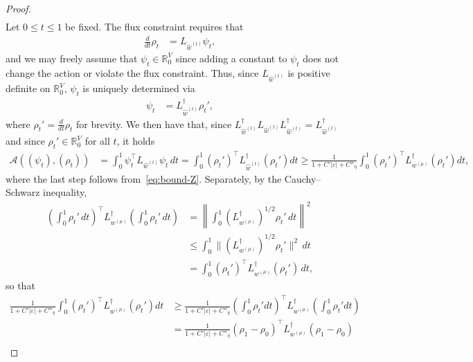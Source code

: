 \documentclass[11pt,a4paper]{article}
\begin{document}
\begin{proof}
\begin{align}
        \end{align}
    Let $0\le t\le 1$ be fixed. The flux constraint requires that
        \begin{align*}
            \frac{d}{dt}\rho_t &= L_{\widehat{w}^{(t)}} \psi_t,
        \end{align*}
    and we may freely assume that $\psi_t\in\mathbb{R}^{V}_0$ since adding a constant to $\psi_t$ does not change the action or violate the flux constraint. Thus, since $L_{\widehat{w}^{(t)}}$ is positive definite on $\mathbb{R}^{V}_0$, $\psi_t$ is uniquely determined via
        \begin{align}\label{eq:psi-t-uniquely-determined}
            \psi_t &= L_{\widehat{w}^{(t)}}^{\dagger} \rho_{t}',
        \end{align}
    where $\rho_{t}' = \frac{d}{dt} \rho_t$ for brevity. We then have that, since $ L_{\widehat{w}^{(t)}}^{\dagger}  L_{\widehat{w}^{(t)}}  L_{\widehat{w}^{(t)}}^{\dagger}  =  L_{\widehat{w}^{(t)}}^{\dagger} $ and since $\rho_{t}'\in\mathbb{R}^{V}_0$ for all $t$, it holds
        \begin{align*}
            \mathcal{A}((\psi_t), (\rho_t)) &= \int_0^1 \psi_t^\top L_{\widehat{w}^{(t)}} \psi_t \, dt = \int_0^1 \left(\rho_{t}'\right)^\top L_{\widehat{w}^{(t)}}^{\dagger} \left(\rho_{t}'\right) dt \geq \frac{1}{1 + C'|\varepsilon| + C''_{\eta}} \int_0^1 (\rho_t')^\top L_{w^{(\mu)}}^\dagger (\rho_t') dt,
        \end{align*}
    where the last step follows from~\cref{eq:bound-Z}. Separately, by the Cauchy--Schwarz inequality,
        \begin{align*}
            \left(\int_0^1 \rho_t' \,dt\right)^\top L_{w^{(\mu)}}^{\dagger} \left(\int_0^1 \rho_t' \,dt\right) &= \left\|\int_0^1 (L_{w^{(\mu)}}^{\dagger})^{1/2} \rho_t'\, dt \right\|^2 \\
            &\leq \int_0^1 \|(L_{w^{(\mu)}}^{\dagger})^{1/2} \rho_t'\|^2 \,dt\\
            &= \int_0^1 (\rho_t')^\top L_{w^{(\mu)}}^\dagger (\rho_t') \,dt,
        \end{align*}
    so that
        \begin{align*}
            \frac{1}{1 + C'|\varepsilon| + C''_{\eta}} \int_0^1 (\rho_t')^\top L_{w^{(\mu)}}^\dagger (\rho_t') dt &\geq \frac{1}{1 + C'|\varepsilon| + C''_{\eta}} \left(\int_0^1 \rho_t' dt\right)^\top L_{w^{(\mu)}}^{\dagger} \left(\int_0^1 \rho_t' dt\right)\\
            &= \frac{1}{1 + C'|\varepsilon| + C''_{\eta}} (\rho_1 - \rho_0)^\top L_{w^{(\mu)}}^{\dagger} (\rho_1 - \rho_0) \\

\end{align*}
\end{proof}
\end{document}
